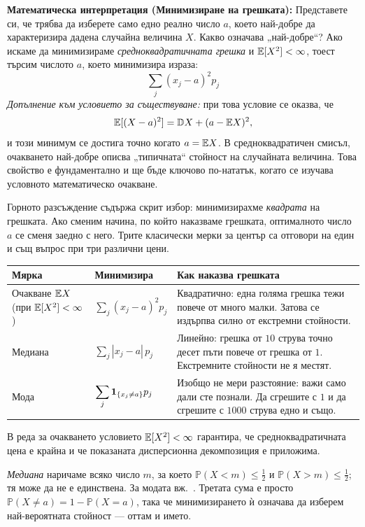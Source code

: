 \textbf{Математическа интерпретация (Минимизиране на грешката):} Представете си, че трябва да изберете само едно реално число $a$, което най-добре да характеризира дадена случайна величина $X$. Какво означава „най-добре“? Ако искаме да минимизираме \emph{средноквадратичната грешка} и $\mathbb{E}[X^2] < \infty$, тоест търсим числото $a$, което минимизира израза:
\[ \sum_{j} (x_j - a)^2 p_j \]
\emph{Допълнение към условието за съществуване:} при това условие се оказва, че
\[
\mathbb{E}[(X-a)^2] = \mathbb{D} X + (a-\mathbb{E} X)^2,
\]
и този минимум се достига точно когато $a = \mathbb{E} X$. В средноквадратичен смисъл, очакването най-добре описва „типичната“ стойност на случайната величина. Това свойство е фундаментално и ще бъде ключово по-нататък, когато се изучава условното математическо очакване.

\begin{supp}\label{supp:center-measures}
Горното разсъждение съдържа скрит избор: минимизирахме \emph{квадрата} на грешката. Ако
сменим начина, по който наказваме грешката, оптималното число $a$ се сменя заедно с него.
Трите класически мерки за център са отговори на един и същ въпрос при три различни цени.

\begin{center}
\small
\begin{tabular}{@{}p{2.5cm}p{3.9cm}p{7.4cm}@{}}
\toprule
\textbf{Мярка} & \textbf{Минимизира} & \textbf{Как наказва грешката} \\
\midrule
Очакване $\mathbb{E} X$ (при $\mathbb{E}[X^2]<\infty$) &
$\displaystyle \sum_j (x_j - a)^2 p_j$ &
Квадратично: една голяма грешка тежи повече от много малки. Затова се издърпва силно от
екстремни стойности. \\[4pt]
Медиана &
$\displaystyle \sum_j |x_j - a|\, p_j$ &
Линейно: грешка от $10$ струва точно десет пъти повече от грешка от $1$. Екстремните
стойности не я местят. \\[4pt]
Мода &
$\displaystyle \sum_j \mathbf{1}_{\{x_j \ne a\}} p_j$ &
Изобщо не мери разстояние: важи само дали сте познали. Да сгрешите с $1$ и да сгрешите с
$1000$ струва едно и също. \\
\bottomrule
\end{tabular}
\end{center}

\noindent
В реда за очакването условието $\mathbb{E}[X^2]<\infty$ гарантира, че средноквадратичната
цена е крайна и че показаната дисперсионна декомпозиция е приложима.

\noindent
\emph{Медиана} наричаме всяко число $m$, за което $\mathbb{P}(X < m) \le \tfrac12$ и
$\mathbb{P}(X > m) \le \tfrac12$; тя може да не е единствена. За модата вж.\
. Третата сума е просто
$\mathbb{P}(X \ne a) = 1 - \mathbb{P}(X = a)$, така че минимизирането ѝ означава да
изберем най-вероятната стойност — оттам и името.


\end{supp}
